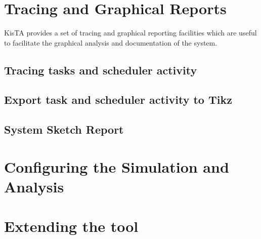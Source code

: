 \documentclass{article}
\begin{document}
\section{Tracing and Graphical Reports}
\label{sec:tracing}

KisTA provides a set of tracing and graphical reporting
facilities which are useful to facilitate the graphical
analysis and documentation of the system.

\subsection{Tracing tasks and scheduler activity}
\label{sec:tracing}


\subsection{Export task and scheduler activity to Tikz}
\label{sec:activity2tikz}


\subsection{System Sketch Report}
\label{sec:sketch_report}



\section{Configuring the Simulation and Analysis}
\label{sec:conf}



\section{Extending the tool}
\label{sec:extending}




%


\printindex
\end{document}
